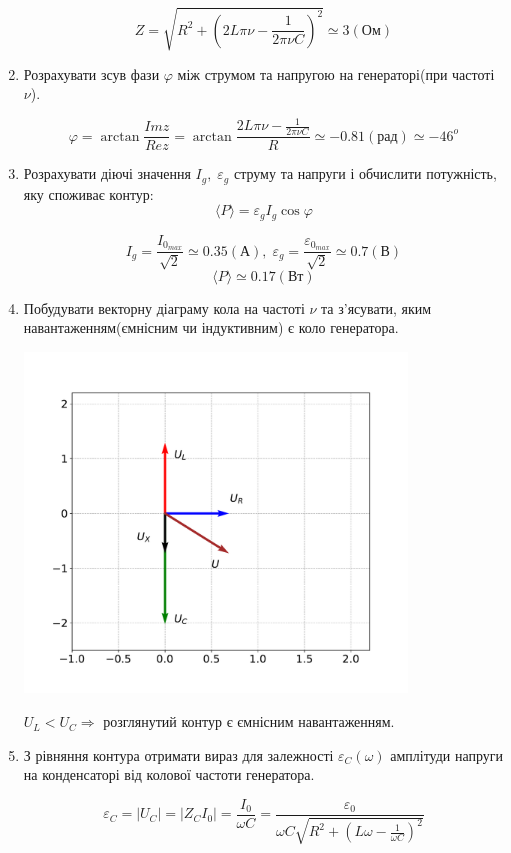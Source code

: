 \documentclass[a4paper, 12pt]{article}
\begin{document}
\begin{enumerate}
    $$ Z = \sqrt{R^2 + \left( 2 L \pi \nu - \frac{1}{2 \pi \nu C} \right)^2} \simeq 3(Ом)$$

    \item Розрахувати зсув фази $\varphi$ між струмом та напругою на генераторі(при частоті $\nu$).
    
    $$ \varphi = \arctan{\frac{Im{z}}{Re{z}}} = \arctan \frac{2 L \pi \nu - \frac{1}{2 \pi \nu C}}{R} \simeq -0.81(рад) \simeq -46^o $$
    
    \item Розрахувати діючі значення $I_g, \; \varepsilon_g$ струму та напруги і
    обчислити потужність, яку споживає контур:
    $$\langle P \rangle = \varepsilon_g I_g \cos{\varphi}$$

    $$ I_g = \frac{I_{0_{max}}}{\sqrt{2}} \simeq 0.35(А),\; 
    \varepsilon_g = \frac{\varepsilon_{0_{max}}}{\sqrt{2}} \simeq 0.7(В)$$
    $$ \langle P \rangle \simeq  0.17(Вт)$$

    \item Побудувати векторну діаграму кола на частоті $\nu$ та
    з'ясувати, яким навантаженням(ємнісним чи індуктивним) є коло генератора.
    
    \includegraphics[width=0.8\textwidth]{graphics/vectorDiagramm.pdf}


    $U_L < U_C \Rightarrow$ розглянутий контур є ємнісним навантаженням.

    \item З рівняння контура отримати вираз для залежності $\varepsilon_C(\omega)$ 
    амплітуди напруги на конденсаторі від колової частоти генератора.
    
    $$ \varepsilon_C = |U_C| = |Z_C I_0| = \frac{I_0}{\omega C} =  \frac{\varepsilon_0}{\omega C\sqrt{R^2 + \left( L \omega - \frac{1}{\omega C} \right)^2}} $$


\end{enumerate}
\end{document}

